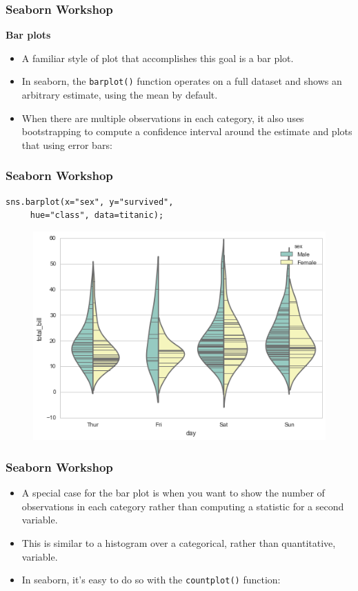 \documentclass{beamer}
\begin{document}
\begin{frame}[fragile]
\frametitle{Seaborn Workshop}
\large
\noindent \textbf{Bar plots}
\begin{itemize}
\item A familiar style of plot that accomplishes this goal is a bar plot. 
\item In seaborn, the \texttt{barplot()} function operates on a full dataset and shows an arbitrary estimate, using the mean by default.
\item When there are multiple observations in each category, it also uses bootstrapping to compute a confidence interval around the estimate and plots that using error bars:
\end{itemize}

\end{frame}
\begin{frame}[fragile]

	\frametitle{Seaborn Workshop}
\large
\begin{verbatim}
sns.barplot(x="sex", y="survived", 
     hue="class", data=titanic);
\end{verbatim}
\begin{figure}
\centering
\includegraphics[width=0.9\linewidth]{images/categorical_29_0}
\end{figure}
\end{frame}
\begin{frame}[fragile]
	\frametitle{Seaborn Workshop}
	\large
\begin{itemize}
\item A special case for the bar plot is when you want to show the number of observations in each category rather than computing a statistic for a second variable. 
\item This is similar to a histogram over a categorical, rather than quantitative, variable. 
\item In seaborn, it’s easy to do so with the \texttt{countplot()} function:
\end{itemize}

\end{frame}
\end{document}

